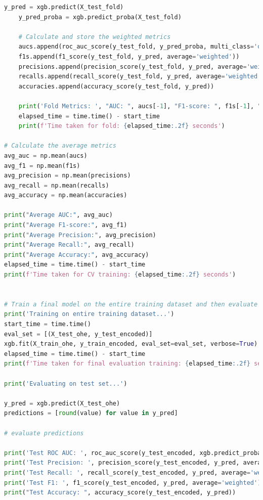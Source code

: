 \begin{appendices}
\begin{lstlisting}[language=Python]
    y_pred = xgb.predict(X_test_fold)
    y_pred_proba = xgb.predict_proba(X_test_fold)
    
    # Calculate and store the weighted metrics
    aucs.append(roc_auc_score(y_test_fold, y_pred_proba, multi_class='ovr', average='weighted'))
    f1s.append(f1_score(y_test_fold, y_pred, average='weighted'))
    precisions.append(precision_score(y_test_fold, y_pred, average='weighted'))
    recalls.append(recall_score(y_test_fold, y_pred, average='weighted'))
    accuracies.append(accuracy_score(y_test_fold, y_pred))
    
    print('Fold Metrics: ', "AUC: ", aucs[-1], "F1-score: ", f1s[-1], "Precision: ", precisions[-1], "Recall: ", recalls[-1], "Accuracy: ", accuracies[-1], "\n")
    elapsed_time = time.time() - start_time
    print(f'Time taken for fold: {elapsed_time:.2f} seconds')

# Calculate the average metrics
avg_auc = np.mean(aucs)
avg_f1 = np.mean(f1s)
avg_precision = np.mean(precisions)
avg_recall = np.mean(recalls)
avg_accuracy = np.mean(accuracies)

print("Average AUC:", avg_auc)
print("Average F1-score:", avg_f1)
print("Average Precision:", avg_precision)
print("Average Recall:", avg_recall)
print("Average Accuracy:", avg_accuracy)
elapsed_time = time.time() - start_time
print(f'Time taken for CV training: {elapsed_time:.2f} seconds')


# Train a final model on the entire training dataset and then evaluate its performance on the test set:
print('Training on entire training dataset...')
start_time = time.time()
eval_set = [(X_test_ohe, y_test_encoded)]
xgb.fit(X_train_ohe, y_train_encoded, eval_set=eval_set, verbose=True)
elapsed_time = time.time() - start_time
print(f'Time taken for final evaluation training: {elapsed_time:.2f} seconds')

print('Evaluating on test set...')

y_pred = xgb.predict(X_test_ohe)
predictions = [round(value) for value in y_pred]

# evaluate predictions

print('Test ROC AUC: ', roc_auc_score(y_test_encoded, xgb.predict_proba(X_test_ohe), multi_class='ovr'))
print('Test Precision: ', precision_score(y_test_encoded, y_pred, average='weighted'))
print('Test Recall: ', recall_score(y_test_encoded, y_pred, average='weighted'))
print('Test F1: ', f1_score(y_test_encoded, y_pred, average='weighted'))
print("Test Accuracy: ", accuracy_score(y_test_encoded, y_pred))


\end{lstlisting}
\end{appendices}
